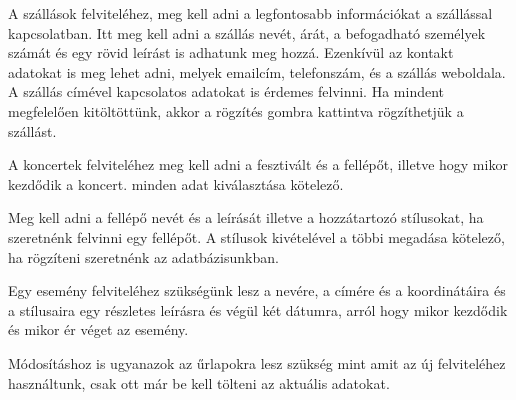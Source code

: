 

A szállások felviteléhez, meg kell adni a legfontosabb információkat a szállással kapcsolatban. Itt meg kell adni a szállás nevét, árát, a befogadható személyek számát és egy rövid leírást is adhatunk meg hozzá. Ezenkívül az kontakt adatokat is meg lehet adni, melyek emailcím, telefonszám, és a szállás weboldala. A szállás címével kapcsolatos adatokat is érdemes felvinni. Ha mindent megfelelően kitöltöttünk, akkor a    rögzítés gombra kattintva rögzíthetjük a szállást.


A koncertek felviteléhez meg kell adni a fesztivált és a fellépőt, illetve hogy mikor kezdődik a koncert. minden adat kiválasztása kötelező.


Meg kell adni a fellépő nevét és a leírását illetve a hozzátartozó stílusokat, ha szeretnénk felvinni egy fellépőt. A stílusok kivételével a többi megadása kötelező, ha rögzíteni szeretnénk az adatbázisunkban.


Egy esemény felviteléhez szükségünk lesz a nevére, a címére és a koordinátáira és a stílusaira egy részletes leírásra és végül két dátumra, arról hogy mikor kezdődik és mikor ér véget az esemény.


Módosításhoz is ugyanazok az űrlapokra lesz szükség mint amit az új felviteléhez használtunk, csak ott már be kell tölteni az aktuális adatokat.
